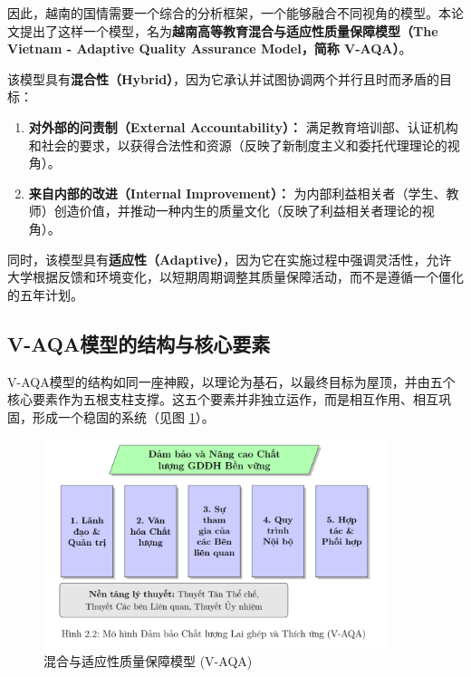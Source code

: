 因此，越南的国情需要一个综合的分析框架，一个能够融合不同视角的模型。本论文提出了这样一个模型，名为\textbf{越南高等教育混合与适应性质量保障模型（The Vietnam - Adaptive Quality Assurance Model，简称 V-AQA）}。

该模型具有\textbf{混合性（Hybrid）}，因为它承认并试图协调两个并行且时而矛盾的目标：
\begin{enumerate}
    \item \textbf{对外部的问责制（External Accountability）：} 满足教育培训部、认证机构和社会的要求，以获得合法性和资源（反映了新制度主义和委托代理理论的视角）。
    \item \textbf{来自内部的改进（Internal Improvement）：} 为内部利益相关者（学生、教师）创造价值，并推动一种内生的质量文化（反映了利益相关者理论的视角）。
\end{enumerate}

同时，该模型具有\textbf{适应性（Adaptive）}，因为它在实施过程中强调灵活性，允许大学根据反馈和环境变化，以短期周期调整其质量保障活动，而不是遵循一个僵化的五年计划。

\subsection{V-AQA模型的结构与核心要素}
\label{subsec:cau_truc_V-AQA}

V-AQA模型的结构如同一座神殿，以理论为基石，以最终目标为屋顶，并由五个核心要素作为五根支柱支撑。这五个要素并非独立运作，而是相互作用、相互巩固，形成一个稳固的系统（见图 \ref{fig:v-aqa-model-detailed}）。

\begin{figure}[h!]
    \centering
    \includegraphics[width=0.9\textwidth]{image/mo_hinh_V-AQA.jpg}
    \caption{混合与适应性质量保障模型 (V-AQA)}
    \label{fig:v-aqa-model-detailed}
\end{figure}

